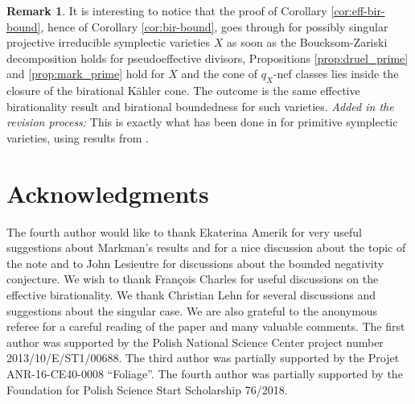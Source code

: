 \documentclass[12pt,reqno]{amsart}
\theoremstyle{plain}
\theoremstyle{definition}
\newtheorem{remark}[thm]{Remark}
\begin{document}
\begin{remark}\label{rmk:ext}
It is interesting to notice that the proof of Corollary \ref{cor:eff-bir-bound}, hence of Corollary \ref{cor:bir-bound}, goes through for possibly singular projective irreducible symplectic varieties $X$ as soon as the Boucksom-Zariski decomposition holds for pseudoeffective divisors, Propositions \ref{prop:druel_prime} and \ref{prop:mark_prime}
hold for $X$ and the cone of $q_X$-nef classes lies inside the closure of the birational K\"ahler cone. The outcome is the same effective birationality result and birational boundedness for such varieties.  {\it Added in the revision process:} This is exactly what has been done in \cite[Theorem 1.1]{LMP3} for primitive symplectic varieties, using results from \cite{LMP2}. 
\end{remark}

\section*{Acknowledgments}
The fourth author would like to thank Ekaterina Amerik for very useful suggestions about Markman's results and for a nice discussion about the topic of the note and to John Lesieutre for discussions about the bounded negativity conjecture. We wish to thank Fran\c cois Charles for useful discussions on the effective birationality. We thank Christian Lehn for several discussions and suggestions about the singular case. We are also grateful to the anonymous referee for a careful reading of the paper and many valuable comments. The first author was supported by the Polish National Science Center project number 2013/10/E/ST1/00688. The third author  was partially supported by the Projet ANR-16-CE40-0008 ``Foliage''.
The fourth author was partially supported by the Foundation for Polish Science Start Scholarship 76/2018.
\end{document}
